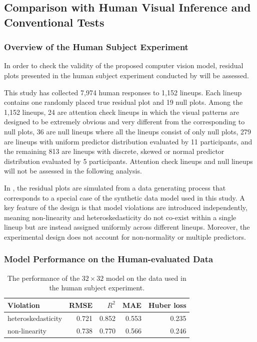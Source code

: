 \documentclass[]{interact}
\theoremstyle{plain}%
\theoremstyle{definition}
\theoremstyle{remark}
\begin{document}
\subsection{Comparison with Human Visual Inference and Conventional
Tests}\label{comparison-with-human-visual-inference-and-conventional-tests}

\subsubsection{Overview of the Human Subject
Experiment}\label{overview-of-the-human-subject-experiment}

In order to check the validity of the proposed computer vision model,
residual plots presented in the human subject experiment conducted by
\citet{li2024plot} will be assessed.

This study has collected 7,974 human responses to 1,152 lineups. Each
lineup contains one randomly placed true residual plot and 19 null
plots. Among the 1,152 lineups, 24 are attention check lineups in which
the visual patterns are designed to be extremely obvious and very
different from the corresponding to null plots, 36 are null lineups
where all the lineups consist of only null plots, 279 are lineups with
uniform predictor distribution evaluated by 11 participants, and the
remaining 813 are lineups with discrete, skewed or normal predictor
distribution evaluated by 5 participants. Attention check lineups and
null lineups will not be assessed in the following analysis.

In \citet{li2024plot}, the residual plots are simulated from a data
generating process that corresponds to a special case of the synthetic
data model used in this study. A key feature of the design is that model
violations are introduced independently, meaning non-linearity and
heteroskedasticity do not co-exist within a single lineup but are
instead assigned uniformly across different lineups. Moreover, the
experimental design does not account for non-normality or multiple
predictors.

\subsubsection{Model Performance on the Human-evaluated
Data}\label{model-performance-on-the-human-evaluated-data}

\begin{table}

\caption{\label{tab:experiment-performance}The performance of the $32 \times 32$ model on the data used in the human subject experiment.}
\centering
\begin{tabular}[t]{lrrrr}
\toprule
Violation & RMSE & $R^2$ & MAE & Huber loss\\
\midrule
heteroskedasticity & 0.721 & 0.852 & 0.553 & 0.235\\
non-linearity & 0.738 & 0.770 & 0.566 & 0.246\\
\bottomrule
\end{tabular}
\end{table}
\end{document}
